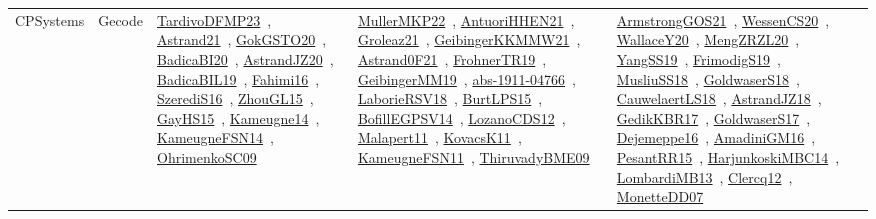 {\begin{longtable}{lp{3cm}>{\raggedright\arraybackslash}p{6cm}>{\raggedright\arraybackslash}p{6cm}>{\raggedright\arraybackslash}p{8cm}}
CPSystems & Gecode & \href{../works/TardivoDFMP23.pdf}{TardivoDFMP23}~\cite{TardivoDFMP23}, \href{../works/Astrand21.pdf}{Astrand21}~\cite{Astrand21}, \href{../works/GokGSTO20.pdf}{GokGSTO20}~\cite{GokGSTO20}, \href{../works/BadicaBI20.pdf}{BadicaBI20}~\cite{BadicaBI20}, \href{../works/AstrandJZ20.pdf}{AstrandJZ20}~\cite{AstrandJZ20}, \href{../works/BadicaBIL19.pdf}{BadicaBIL19}~\cite{BadicaBIL19}, \href{../works/Fahimi16.pdf}{Fahimi16}~\cite{Fahimi16}, \href{../works/SzerediS16.pdf}{SzerediS16}~\cite{SzerediS16}, \href{../works/ZhouGL15.pdf}{ZhouGL15}~\cite{ZhouGL15}, \href{../works/GayHS15.pdf}{GayHS15}~\cite{GayHS15}, \href{../works/Kameugne14.pdf}{Kameugne14}~\cite{Kameugne14}, \href{../works/KameugneFSN14.pdf}{KameugneFSN14}~\cite{KameugneFSN14}, \href{../works/OhrimenkoSC09.pdf}{OhrimenkoSC09}~\cite{OhrimenkoSC09} & \href{../works/MullerMKP22.pdf}{MullerMKP22}~\cite{MullerMKP22}, \href{../works/AntuoriHHEN21.pdf}{AntuoriHHEN21}~\cite{AntuoriHHEN21}, \href{../works/Groleaz21.pdf}{Groleaz21}~\cite{Groleaz21}, \href{../works/GeibingerKKMMW21.pdf}{GeibingerKKMMW21}~\cite{GeibingerKKMMW21}, \href{../works/Astrand0F21.pdf}{Astrand0F21}~\cite{Astrand0F21}, \href{../works/FrohnerTR19.pdf}{FrohnerTR19}~\cite{FrohnerTR19}, \href{../works/GeibingerMM19.pdf}{GeibingerMM19}~\cite{GeibingerMM19}, \href{../works/abs-1911-04766.pdf}{abs-1911-04766}~\cite{abs-1911-04766}, \href{../works/LaborieRSV18.pdf}{LaborieRSV18}~\cite{LaborieRSV18}, \href{../works/BurtLPS15.pdf}{BurtLPS15}~\cite{BurtLPS15}, \href{../works/BofillEGPSV14.pdf}{BofillEGPSV14}~\cite{BofillEGPSV14}, \href{../works/LozanoCDS12.pdf}{LozanoCDS12}~\cite{LozanoCDS12}, \href{../works/Malapert11.pdf}{Malapert11}~\cite{Malapert11}, \href{../works/KovacsK11.pdf}{KovacsK11}~\cite{KovacsK11}, \href{../works/KameugneFSN11.pdf}{KameugneFSN11}~\cite{KameugneFSN11}, \href{../works/ThiruvadyBME09.pdf}{ThiruvadyBME09}~\cite{ThiruvadyBME09} & \href{../works/ArmstrongGOS21.pdf}{ArmstrongGOS21}~\cite{ArmstrongGOS21}, \href{../works/WessenCS20.pdf}{WessenCS20}~\cite{WessenCS20}, \href{../works/WallaceY20.pdf}{WallaceY20}~\cite{WallaceY20}, \href{../works/MengZRZL20.pdf}{MengZRZL20}~\cite{MengZRZL20}, \href{../works/YangSS19.pdf}{YangSS19}~\cite{YangSS19}, \href{../works/FrimodigS19.pdf}{FrimodigS19}~\cite{FrimodigS19}, \href{../works/MusliuSS18.pdf}{MusliuSS18}~\cite{MusliuSS18}, \href{../works/GoldwaserS18.pdf}{GoldwaserS18}~\cite{GoldwaserS18}, \href{../works/CauwelaertLS18.pdf}{CauwelaertLS18}~\cite{CauwelaertLS18}, \href{../works/AstrandJZ18.pdf}{AstrandJZ18}~\cite{AstrandJZ18}, \href{../works/GedikKBR17.pdf}{GedikKBR17}~\cite{GedikKBR17}, \href{../works/GoldwaserS17.pdf}{GoldwaserS17}~\cite{GoldwaserS17}, \href{../works/Dejemeppe16.pdf}{Dejemeppe16}~\cite{Dejemeppe16}, \href{../works/AmadiniGM16.pdf}{AmadiniGM16}~\cite{AmadiniGM16}, \href{../works/PesantRR15.pdf}{PesantRR15}~\cite{PesantRR15}, \href{../works/HarjunkoskiMBC14.pdf}{HarjunkoskiMBC14}~\cite{HarjunkoskiMBC14}, \href{../works/LombardiMB13.pdf}{LombardiMB13}~\cite{LombardiMB13}, \href{../works/Clercq12.pdf}{Clercq12}~\cite{Clercq12}, \href{../works/MonetteDD07.pdf}{MonetteDD07}~\cite{MonetteDD07}\\

\end{longtable}}
